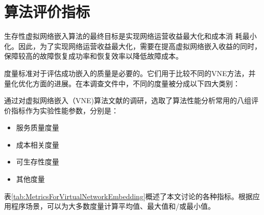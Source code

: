 \section{算法评价指标}
生存性虚拟网络嵌入算法的最终目标是实现网络运营收益最大化和成本消 耗最小化。因此，为了实现网络运营收益最大化，需要在提高虚拟网络嵌入收益的同时，保障较高的故障恢复成功率和恢复效率以降低故障成本。

度量标准对于评估成功嵌入的质量是必要的。它们用于比较不同的VNE方法，并量化优化方面的进展。在本调查文件中，不同的度量被分成以下四大类别：

通过对虚拟网络嵌入（VNE)算法文献的调研，选取了算法性能分析常用的八组评价指标作为实验性能参数，分别是：
\begin{itemize}
  \item 服务质量度量
  \item 成本相关度量
  \item 可生存性度量
  \item 其他度量
\end{itemize}
表\ref{tab:MetricsForVirtualNetworkEmbedding}概述了本文讨论的各种指标。根据应用程序场景，可以为大多数度量计算平均值、最大值和/或最小值。
